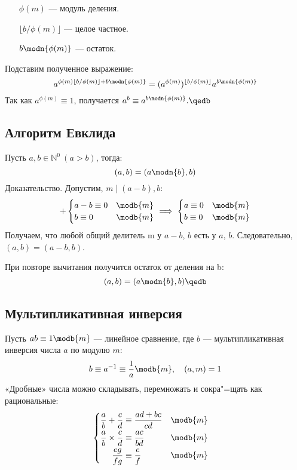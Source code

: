 \begin{itemize}[itemindent=18mm]
\item[$\phi(m)$] --- модуль деления.\\
\item[$\lfloor b/\phi(m)\rfloor$] --- целое частное.\\
\item[$b\modn{\phi(m)}$] --- остаток.
\end{itemize}

Подставим полученное выражение:
$$a^{\phi(m)\lfloor b/\phi(m)\rfloor+b\modn{\phi(m)}}=(a^{\phi(m)})^{\lfloor b/\phi(m)\rfloor}a^{b\modn{\phi(m)}}$$
Так как $a^{\phi(m)}\equiv 1$, получается $a^b\equiv a^{b\modn{\phi(m)}}.\qedb$

\newpage
\subsection{Алгоритм Евклида}
Пусть $a,b\in\mathbb{N}^{0}\ (a>b)$, тогда:
$$(a,b)=(a\modn{b},b)$$
{\bold Доказательство.} Допустим, $m\mid (a-b),b$:
$$+
\begin{cases}
a-b\equiv 0&\modb{m}\\
b\equiv 0&\modb{m}
\end{cases}\implies
\begin{cases}
a\equiv 0&\modb{m}\\
b\equiv 0&\modb{m}
\end{cases}
$$
Получаем, что любой общий делитель {\ital m} у $a-b$, $b$ есть у $a$, $b$.
Следовательно, $(a,b)=(a-b,b)$.\par
При повторе вычитания получится остаток от деления на {\ital b}:
$$(a,b)=(a\modn{b},b)\qedb$$

\subsection{Мультипликативная инверсия}

Пусть $ab\equiv 1\modb{m}$ --- линейное сравнение, где $b$ --- {\bold мультипликативная инверсия} числа $a$ по модулю $m$:
$$b\equiv a^{-1}\equiv\frac{1}{a}\modb{m},\quad(a,m)=1$$
«Дробные» числа можно {\ital складывать}, {\ital перемножать} и {\ital сокра"=щать} как рациональные:
$$\begin{cases}\begin{aligned}
\frac{a}{b}+\frac{c}{d}&\equiv\frac{ad+bc}{cd} &\modb{m}\\
\frac{a}{b}\times\frac{c}{d}&\equiv\frac{ac}{bd} &\modb{m}\\
\frac{eg}{fg}&\equiv\frac{e}{f} &\modb{m}
\end{aligned}\end{cases}$$

